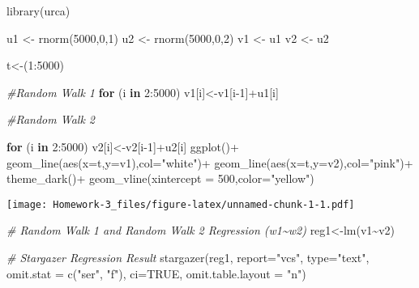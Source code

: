 \documentclass[
]{article}
\newenvironment{Shaded}{\begin{snugshade}}{\end{snugshade}}
\newcommand{\AttributeTok}[1]{\textcolor[rgb]{0.77,0.63,0.00}{#1}}
\newcommand{\CommentTok}[1]{\textcolor[rgb]{0.56,0.35,0.01}{\textit{#1}}}
\newcommand{\ConstantTok}[1]{\textcolor[rgb]{0.00,0.00,0.00}{#1}}
\newcommand{\ControlFlowTok}[1]{\textcolor[rgb]{0.13,0.29,0.53}{\textbf{#1}}}
\newcommand{\DecValTok}[1]{\textcolor[rgb]{0.00,0.00,0.81}{#1}}
\newcommand{\FunctionTok}[1]{\textcolor[rgb]{0.00,0.00,0.00}{#1}}
\newcommand{\NormalTok}[1]{#1}
\newcommand{\OtherTok}[1]{\textcolor[rgb]{0.56,0.35,0.01}{#1}}
\newcommand{\SpecialCharTok}[1]{\textcolor[rgb]{0.00,0.00,0.00}{#1}}
\newcommand{\StringTok}[1]{\textcolor[rgb]{0.31,0.60,0.02}{#1}}
\begin{document}
\begin{Shaded}
\begin{Highlighting}[]
\FunctionTok{library}\NormalTok{(urca)}

\NormalTok{u1 }\OtherTok{\textless{}{-}} \FunctionTok{rnorm}\NormalTok{(}\DecValTok{5000}\NormalTok{,}\DecValTok{0}\NormalTok{,}\DecValTok{1}\NormalTok{)}
\NormalTok{u2 }\OtherTok{\textless{}{-}} \FunctionTok{rnorm}\NormalTok{(}\DecValTok{5000}\NormalTok{,}\DecValTok{0}\NormalTok{,}\DecValTok{2}\NormalTok{)}
\NormalTok{v1 }\OtherTok{\textless{}{-}}\NormalTok{ u1}
\NormalTok{v2 }\OtherTok{\textless{}{-}}\NormalTok{ u2}

\NormalTok{t}\OtherTok{\textless{}{-}}\NormalTok{(}\DecValTok{1}\SpecialCharTok{:}\DecValTok{5000}\NormalTok{)}

\CommentTok{\#Random Walk  1}
\ControlFlowTok{for}\NormalTok{ (i }\ControlFlowTok{in} \DecValTok{2}\SpecialCharTok{:}\DecValTok{5000}\NormalTok{) v1[i]}\OtherTok{\textless{}{-}}\NormalTok{v1[i}\DecValTok{{-}1}\NormalTok{]}\SpecialCharTok{+}\NormalTok{u1[i] }

\CommentTok{\#Random Walk  2}

\ControlFlowTok{for}\NormalTok{ (i }\ControlFlowTok{in} \DecValTok{2}\SpecialCharTok{:}\DecValTok{5000}\NormalTok{) v2[i]}\OtherTok{\textless{}{-}}\NormalTok{v2[i}\DecValTok{{-}1}\NormalTok{]}\SpecialCharTok{+}\NormalTok{u2[i] }
\FunctionTok{ggplot}\NormalTok{()}\SpecialCharTok{+}
  \FunctionTok{geom\_line}\NormalTok{(}\FunctionTok{aes}\NormalTok{(}\AttributeTok{x=}\NormalTok{t,}\AttributeTok{y=}\NormalTok{v1),}\AttributeTok{col=}\StringTok{"white"}\NormalTok{)}\SpecialCharTok{+}
  \FunctionTok{geom\_line}\NormalTok{(}\FunctionTok{aes}\NormalTok{(}\AttributeTok{x=}\NormalTok{t,}\AttributeTok{y=}\NormalTok{v2),}\AttributeTok{col=}\StringTok{"pink"}\NormalTok{)}\SpecialCharTok{+}
  \FunctionTok{theme\_dark}\NormalTok{()}\SpecialCharTok{+}
  \FunctionTok{geom\_vline}\NormalTok{(}\AttributeTok{xintercept =} \DecValTok{500}\NormalTok{,}\AttributeTok{color=}\StringTok{"yellow"}\NormalTok{)}
\end{Highlighting}
\end{Shaded}

\texttt{[image: Homework-3\_files/figure-latex/unnamed-chunk-1-1.pdf]}

\begin{Shaded}
\begin{Highlighting}[]
\CommentTok{\# Random Walk 1 and Random Walk 2 Regression (w1\textasciitilde{}w2)}
\NormalTok{reg1}\OtherTok{\textless{}{-}}\FunctionTok{lm}\NormalTok{(v1}\SpecialCharTok{\textasciitilde{}}\NormalTok{v2)}

\CommentTok{\# Stargazer Regression Result}
\FunctionTok{stargazer}\NormalTok{(reg1, }\AttributeTok{report=}\StringTok{"vcs"}\NormalTok{, }\AttributeTok{type=}\StringTok{"text"}\NormalTok{,}
          \AttributeTok{omit.stat =} \FunctionTok{c}\NormalTok{(}\StringTok{"ser"}\NormalTok{, }\StringTok{"f"}\NormalTok{),}
          \AttributeTok{ci=}\ConstantTok{TRUE}\NormalTok{, }\AttributeTok{omit.table.layout =} \StringTok{"n"}\NormalTok{)}
\end{Highlighting}
\end{Shaded}
\end{document}
